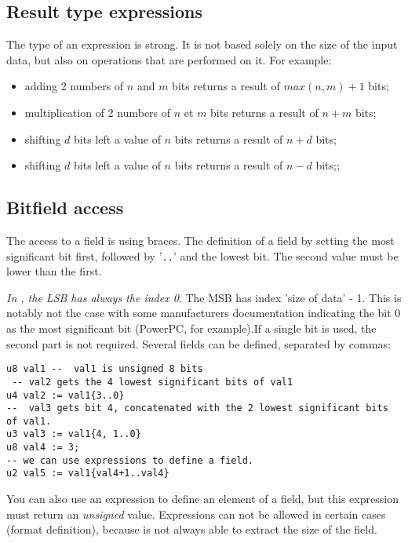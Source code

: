 
\subsection{Result type expressions}
\label{sec:typeExp}
The type of an expression is strong. It is not based solely on the size of the input data, but also on operations that are performed on it. For example:
\begin{itemize}
\item adding 2 numbers of $n$ and $m$ bits returns a result of $max(n,m)+1$ bits;
\item multiplication of 2 numbers of $n$ et $m$ bits returns a result of $n+m$ bits;
\item shifting $d$ bits left a value of $n$ bits returns a result of $n+d$ bits;
\item shifting $d$ bits left a value of $n$ bits returns a result of $n-d$ bits;;
\end{itemize}

\subsection{Bitfield access}
\label{sec:field}
The access to a field is using braces. The definition of a field by setting the most significant bit first, followed by '\texttt{..}' and the lowest bit. The second value must be lower than the first.

\emph{In \harmless, the LSB has always the index 0}. The MSB has index 'size of data' - 1. 
This is notably not the case with some manufacturers documentation indicating the bit 0 as the most significant bit (PowerPC, for example).If a single bit is used, the second part is not required. Several fields can be defined, separated by commas:
\begin{lstlisting}
u8 val1 --  val1 is unsigned 8 bits
 -- val2 gets the 4 lowest significant bits of val1
u4 val2 := val1{3..0}
--  val3 gets bit 4, concatenated with the 2 lowest significant bits of val1.
u3 val3 := val1{4, 1..0}
u8 val4 := 3;
-- we can use expressions to define a field.
u2 val5 := val1{val4+1..val4}
\end{lstlisting}

You can also use an expression to define an element of a field, but this expression must return an \emph{unsigned} value. Expressions can not be allowed in certain cases (format definition), because \harmless is not always able to extract the size of the field.

